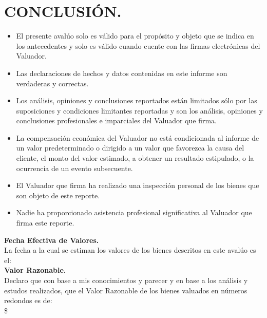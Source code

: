 \chapter{CONCLUSIÓN.} %
\begin{itemize}
	\item El presente avalúo solo es válido para el propósito y objeto que se indica en los antecedentes y solo es válido cuando cuente con las firmas electrónicas del Valuador.
	\item Las declaraciones de hechos y datos contenidas en este informe son verdaderas y correctas.
	\item Los análisis, opiniones y conclusiones reportados están limitados sólo por las suposiciones y condiciones limitantes reportadas y son los análisis, opiniones y conclusiones profesionales e imparciales del Valuador que firma.
	\item La compensación económica del Valuador no está condicionada al informe de un valor predeterminado o dirigido a un valor que favorezca la causa del cliente, el monto del valor estimado, a obtener un resultado estipulado, o la ocurrencia de un evento subsecuente.
	\item El Valuador que firma ha realizado una inspección personal de los bienes que son objeto de este reporte. 
	\item Nadie ha proporcionado asistencia profesional significativa al Valuador que firma este reporte.
\end{itemize}
\textbf{Fecha Efectiva de Valores.} \\ 
La fecha a la cual se estiman los valores de los bienes descritos en este avalúo es el: \hspace{1cm} \fechaInforme \\ 
\textbf{Valor Razonable.} \\ 
Declaro que con base a mis conocimientos y parecer y en base a los análisis y estudos realizados, que el Valor Razonable de los bienes valuados en números redondos es de: \\[1cm]
\hfill 
{\large \$\valorMaquinaria}
\hfill 
{\large \valorMaquinariaLetra}
\hfill
\\ 
